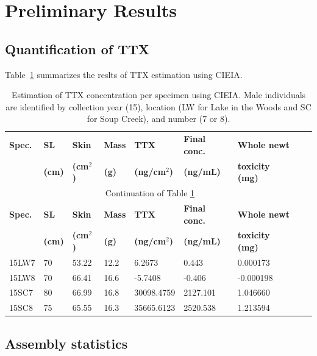 \section{Preliminary Results}

\subsection{Quantification of TTX}

Table~\ref{tab:ttx} summarizes the reslts of TTX estimation using CIEIA.

\begin{small}\begin{longtable}[c]{lllllllll}
    \caption{Estimation of TTX concentration per specimen using CIEIA. Male individuals are identified by collection year (15), location (LW for Lake in the Woods and SC for Soup Creek), and number (7 or 8). \label{tab:ttx}} \\
    \hline
    \hline
    \textbf{Spec.} & \textbf{SL} & \textbf{Skin} & \textbf{Mass} & \textbf{TTX} & \textbf{Final conc.} & \textbf{Whole newt} \\
     & \textbf{(cm)} & \textbf{(cm$^{2}$)} & \textbf{(g)} & \textbf{(ng/cm$^{2}$)} & \textbf{(ng/mL)} & \textbf{toxicity (mg)} \\
    \hline
    \endfirsthead
    \multicolumn{7}{c}{Continuation of Table \ref{tab:ttx}}\\
    \hline
    \textbf{Spec.} & \textbf{SL} & \textbf{Skin} & \textbf{Mass} & \textbf{TTX} & \textbf{Final conc.} & \textbf{Whole newt} \\
     & \textbf{(cm)} & \textbf{(cm$^{2}$)} & \textbf{(g)} & \textbf{(ng/cm$^{2}$)} & \textbf{(ng/mL)} & \textbf{toxicity (mg)} \\
    \hline
    \endhead
    15LW7 & 70 & 53.22 & 12.2 & 6.2673 & 0.443 & 0.000173 \\
    15LW8 & 70 & 66.41 & 16.6 & -5.7408 & -0.406 & -0.000198 \\
    15SC7 & 80 & 66.99 & 16.8 & 30098.4759 & 2127.101 & 1.046660 \\
    15SC8 & 75 & 65.55 & 16.3 & 35665.6123 & 2520.538 & 1.213594 \\
    \hline
\end{longtable}\end{small}

\subsection{Assembly statistics}

